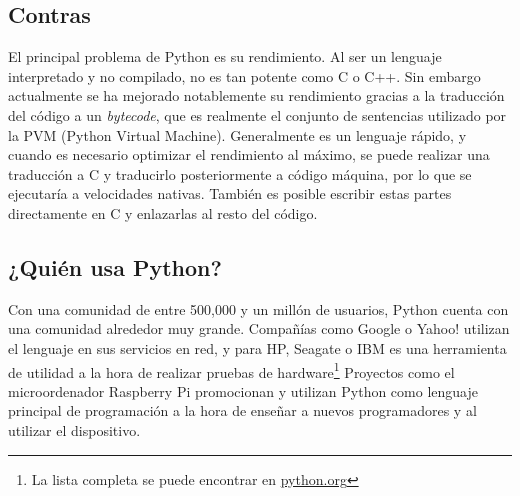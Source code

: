 \documentclass[12pt]{article} %
\begin{document}

\subsection{Contras} %

El principal problema de Python es su rendimiento. Al ser un lenguaje interpretado y no compilado, no es tan potente como C o C++. Sin embargo actualmente se ha mejorado notablemente su rendimiento gracias a la traducción del código a un \textit{bytecode}, que es realmente el conjunto de sentencias utilizado por la PVM (Python Virtual Machine).
Generalmente es un lenguaje rápido, y cuando es necesario optimizar el rendimiento al máximo, se puede realizar una traducción a C y traducirlo posteriormente a código máquina, por lo que se ejecutaría a velocidades nativas. También es posible escribir estas partes directamente en C y enlazarlas al resto del código.


\subsection{¿Quién usa Python?} %

Con una comunidad de entre 500,000 y un millón de usuarios, Python cuenta con una comunidad alrededor muy grande. Compañías como Google o Yahoo! utilizan el lenguaje en sus servicios en red, y para HP, Seagate o IBM es una herramienta de utilidad a la hora de realizar pruebas de hardware\footnote{La lista completa se puede encontrar en \href{http://www.python.org}{python.org}}
Proyectos como el microordenador Raspberry Pi promocionan y utilizan Python como lenguaje principal de programación a la hora de enseñar a nuevos programadores y al utilizar el dispositivo.

%
%
%
%

%
\end{document}
